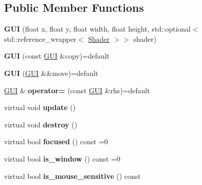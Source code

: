 \subsection*{Public Member Functions}
\begin{DoxyCompactItemize}
\item 
\mbox{\label{class_g_u_i_a7af10a4c97e3e2c7f59134458ce36d6f}} 
{\bfseries G\+UI} (float x, float y, float width, float height, std\+::optional$<$ std\+::reference\+\_\+wrapper$<$ \mbox{\hyperlink{class_shader}{Shader}} $>$$>$ shader)
\item 
\mbox{\label{class_g_u_i_a071cf680ab23b8025b6fc92bc2ca3fb3}} 
{\bfseries G\+UI} (const \mbox{\hyperlink{class_g_u_i}{G\+UI}} \&copy)=default
\item 
\mbox{\label{class_g_u_i_a71a1600d17857a2e635a587abf7ced00}} 
{\bfseries G\+UI} (\mbox{\hyperlink{class_g_u_i}{G\+UI}} \&\&move)=default
\item 
\mbox{\label{class_g_u_i_ac0b15dbc3128f1272ae678f1b2cdc89a}} 
\mbox{\hyperlink{class_g_u_i}{G\+UI}} \& {\bfseries operator=} (const \mbox{\hyperlink{class_g_u_i}{G\+UI}} \&rhs)=default
\item 
\mbox{\label{class_g_u_i_a947e568bf884a8798e3e368417f662c7}} 
virtual void {\bfseries update} ()
\item 
\mbox{\label{class_g_u_i_a2abe7f08a1da35af8ae006fbecea94e0}} 
virtual void {\bfseries destroy} ()
\item 
\mbox{\label{class_g_u_i_ad2a7c1ae3938ba1d6dea0142f16d6c2b}} 
virtual bool {\bfseries focused} () const =0
\item 
\mbox{\label{class_g_u_i_a7ef5287aaa630a8d1146f0d5a35b6683}} 
virtual bool {\bfseries is\+\_\+window} () const =0
\item 
\mbox{\label{class_g_u_i_aff34edd65faff6f3e908070a2060f6b8}} 
virtual bool {\bfseries is\+\_\+mouse\+\_\+sensitive} () const
\item 
\mbox{\label{class_g_u_i_abbad56adda65a7176a4e0c7e260d9449}} 
$$
\end{DoxyCompactItemize}
